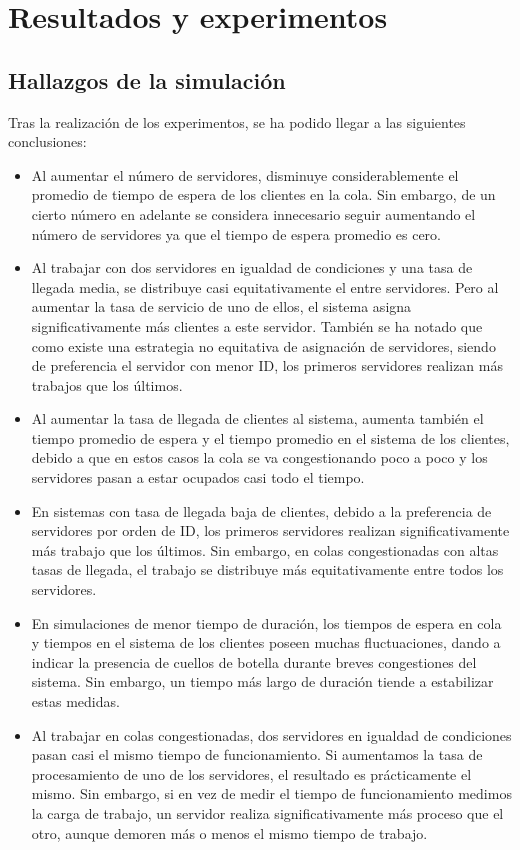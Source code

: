 \documentclass[12pt,a4paper]{article}
\begin{document}
\section{Resultados y experimentos}
\subsection{Hallazgos de la simulación}
Tras la realización de los experimentos, se ha podido llegar a las siguientes conclusiones:
\begin{itemize}
\item Al aumentar el número de servidores, disminuye considerablemente el promedio de tiempo de espera de los clientes en la cola. Sin embargo, de un cierto número en adelante se considera innecesario seguir aumentando el número de servidores ya que el tiempo de espera promedio es cero.
\item Al trabajar con dos servidores en igualdad de condiciones y una tasa de llegada media, se distribuye casi equitativamente el entre servidores. Pero al aumentar la tasa de servicio de uno de ellos, el sistema asigna significativamente más clientes a este servidor. También se ha notado que como existe una estrategia no equitativa de asignación de servidores, siendo de preferencia el servidor con menor ID, los primeros servidores realizan más trabajos que los últimos. 
\item Al aumentar la tasa de llegada de clientes al sistema, aumenta también el tiempo promedio de espera y el tiempo promedio en el sistema de los clientes, debido a que en estos casos la cola se va congestionando poco a poco y los servidores pasan a estar ocupados casi todo el tiempo.
\item En sistemas con tasa de llegada baja de clientes, debido a la preferencia de servidores por orden de ID, los primeros servidores realizan significativamente más trabajo que los últimos. Sin embargo, en colas congestionadas con altas tasas de llegada, el trabajo se distribuye más equitativamente entre todos los servidores.
\item En simulaciones de menor tiempo de duración, los tiempos de espera en cola y tiempos en el sistema de los clientes poseen muchas fluctuaciones, dando a indicar la presencia de cuellos de botella durante breves congestiones del sistema. Sin embargo, un tiempo más largo de duración tiende a estabilizar estas medidas.
\item Al trabajar en colas congestionadas, dos servidores en igualdad de condiciones pasan casi el mismo tiempo de funcionamiento. Si aumentamos la tasa de procesamiento de uno de los servidores, el resultado es prácticamente el mismo. Sin embargo, si en vez de medir el  tiempo de funcionamiento medimos la carga de trabajo, un servidor realiza significativamente más proceso que el otro, aunque demoren más o menos el mismo tiempo de trabajo.

\end{itemize}
\end{document}

